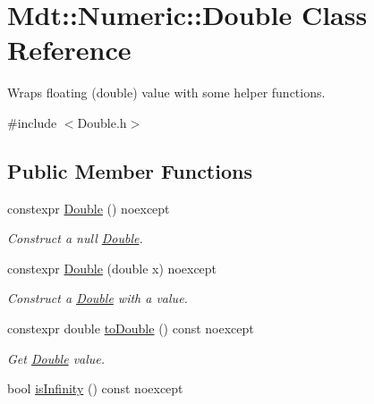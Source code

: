 \hypertarget{class_mdt_1_1_numeric_1_1_double}{}\section{Mdt\+:\+:Numeric\+:\+:Double Class Reference}
\label{class_mdt_1_1_numeric_1_1_double}


Wraps floating (double) value with some helper functions.  




{\ttfamily \#include $<$Double.\+h$>$}

\subsection*{Public Member Functions}
\begin{DoxyCompactItemize}
\item 
constexpr \hyperlink{class_mdt_1_1_numeric_1_1_double_ae340e90c5924e4e38a6c79c4d6ebdd04}{Double} () noexcept\hypertarget{class_mdt_1_1_numeric_1_1_double_ae340e90c5924e4e38a6c79c4d6ebdd04}{}\label{class_mdt_1_1_numeric_1_1_double_ae340e90c5924e4e38a6c79c4d6ebdd04}

\begin{DoxyCompactList}\small\item\em Construct a null \hyperlink{class_mdt_1_1_numeric_1_1_double}{Double}. \end{DoxyCompactList}\item 
constexpr \hyperlink{class_mdt_1_1_numeric_1_1_double_a3d99ae951bf2716fe59c81e1efa5387a}{Double} (double x) noexcept\hypertarget{class_mdt_1_1_numeric_1_1_double_a3d99ae951bf2716fe59c81e1efa5387a}{}\label{class_mdt_1_1_numeric_1_1_double_a3d99ae951bf2716fe59c81e1efa5387a}

\begin{DoxyCompactList}\small\item\em Construct a \hyperlink{class_mdt_1_1_numeric_1_1_double}{Double} with a value. \end{DoxyCompactList}\item 
constexpr double \hyperlink{class_mdt_1_1_numeric_1_1_double_a962b13f89e149e5e7cec93405513479d}{to\+Double} () const noexcept
\begin{DoxyCompactList}\small\item\em Get \hyperlink{class_mdt_1_1_numeric_1_1_double}{Double} value. \end{DoxyCompactList}\item 
bool \hyperlink{class_mdt_1_1_numeric_1_1_double_a72129dd1dd50fdf7503091a3c5881d1a}{is\+Infinity} () const noexcept\hypertarget{class_mdt_1_1_numeric_1_1_double_a72129dd1dd50fdf7503091a3c5881d1a}{}\label{class_mdt_1_1_numeric_1_1_double_a72129dd1dd50fdf7503091a3c5881d1a}


\end{DoxyCompactItemize}
